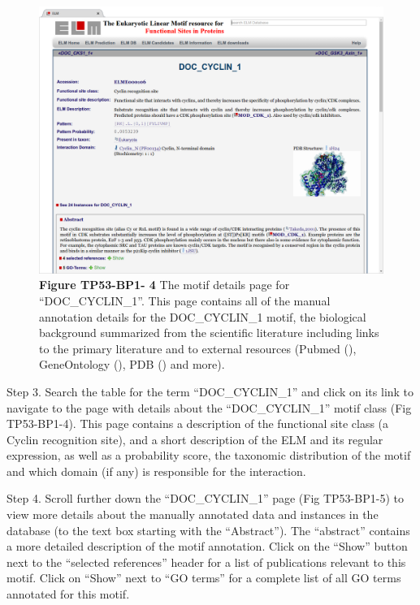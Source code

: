 \begin{figure}[h!]
\centering
\includegraphics[width=\textwidth]{Figures/TP53_1/doc_cyclin_1_class.png}
\caption{
\textbf{Figure TP53-BP1- 4} 
The motif details page for
``DOC\_CYCLIN\_1''. This page contains all of the manual annotation
details for the DOC\_CYCLIN\_1 motif, the biological background
summarized from the scientific literature including links to the primary
literature and to external resources (Pubmed (\cite{27899561}),
GeneOntology (\cite{27899567}), PDB (\cite{12037327}) and more).
}
\end{figure}

Step 3. Search the table for the term ``DOC\_CYCLIN\_1'' and click on
its link to navigate to the page with details about the
``DOC\_CYCLIN\_1'' motif class (Fig TP53-BP1-4). This page contains a
description of the functional site class (a Cyclin recognition site),
and a short description of the ELM and its regular expression, as well
as a probability score, the taxonomic distribution of the motif and
which domain (if any) is responsible for the interaction.


Step 4. Scroll further down the ``DOC\_CYCLIN\_1'' page (Fig TP53-BP1-5)
to view more details about the manually annotated data and instances in
the database (to the text box starting with the ``Abstract''). The
``abstract'' contains a more detailed description of the motif
annotation. Click on the ``Show'' button next to the ``selected
references'' header for a list of publications relevant to this motif.
Click on ``Show'' next to ``GO terms'' for a complete list of all GO
terms annotated for this motif.

